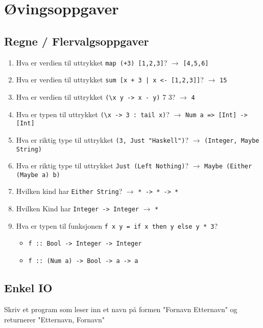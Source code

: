 \documentclass{article}
\begin{document}
\section{Øvingsoppgaver}
    \subsection{Regne / Flervalgsoppgaver}

    \begin{enumerate}[label=\alph*)]
        \item Hva er verdien til uttrykket \texttt{map (+3) [1,2,3]}? \( \rightarrow  \) \texttt{[4,5,6]}
        \item Hva er verdien til uttrykket \texttt{sum [x + 3 | x <- [1,2,3]]}? \( \rightarrow \) \texttt{15}
        \item Hva er verdien til uttrykket \verb!(\!\texttt{x y -> x - y)} 7 3? \( \rightarrow \) \texttt{4}
        \item Hva er typen til uttrykket \verb!(\!\texttt{x -> 3 : tail x)}? \( \rightarrow \) \texttt{Num a => [Int] -> [Int]}
        \item Hva er riktig type til uttrykket \texttt{(3, Just "Haskell")}? \( \rightarrow \) \texttt{(Integer, Maybe String)}
        \item Hva er riktig type til uttrykket \texttt{Just (Left Nothing)}? \( \rightarrow \) \texttt{Maybe (Either (Maybe a) b)}
        \item Hvilken kind har \texttt{Either String}? \( \rightarrow \) \texttt{* -> * -> *}
        \item Hvilken Kind har \texttt{Integer -> Integer} \( \rightarrow \) \texttt{*}
        \item Hva er typen til funksjonen \texttt{f x y = if x then y else y * 3}?
            \begin{itemize}
                \item \texttt{f :: Bool -> Integer -> Integer}
                \item \texttt{f :: (Num a) -> Bool -> a -> a}
            \end{itemize}
    \end{enumerate}

    \subsection{Enkel IO}
    Skriv et program som leser inn et navn på formen "Fornavn Etternavn" og returnerer "Etternavn, Fornavn"
\end{document}

